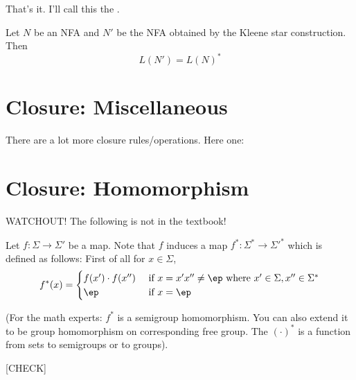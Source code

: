 That's it. 
I'll call this the .



\begin{thm}
Let $N$ be an NFA and $N'$ be the NFA obtained by the Kleene star 
construction.
Then
\[
L(N') = L(N)^*
\]
\end{thm}









\newpage
\section{Closure: Miscellaneous}

There are a lot more closure rules/operations.
Here one:



\newpage
\section{Closure: Homomorphism}

WATCHOUT! The following is not in the textbook!

\begin{defn}
  Let $f : \Sigma \rightarrow \Sigma'$ be a map. Note that $f$
  induces a map $f^* : \Sigma^* \rightarrow \Sigma'^*$ which is
  defined as follows: First of all for $x \in \Sigma$,
  \[
    f^*(x) =
    \begin{cases}
      f(x') \cdot f(x'') & \text{ if } x = x'x'' \neq \ep \text{ where } x' \in \Sigma, x'' \in \Sigma^*\cr
      \ep & \text{ if } x = \ep \cr
    \end{cases}
  \]
\end{defn}

(For the math experts: $f^*$ is a semigroup homomorphism. You can
also extend it to be group homomorphism on corresponding free
group. The $(\cdot)^*$ is a function from sets to semigroups or to
groups).

[CHECK]




